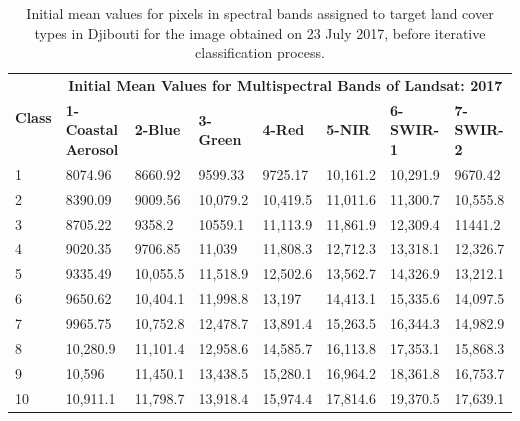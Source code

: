 \documentclass[jimaging,article,accept,pdftex,moreauthors]{Definitions/mdpi}
\begin{document}
\vspace{-6pt}
\begin{table}[H]\footnotesize
  \caption{Initial mean values for pixels in spectral bands assigned to target land cover types in Djibouti for the image obtained on 23 July 2017, before iterative classification process.}
  \centering
  \begin{tabularx}{\textwidth}{p{0.7cm}p{2.5cm}p{1.0cm}p{1.3cm}p{1.0cm}p{1.0cm}p{1.5cm}p{1.5cm}}
  \toprule
  \multirow{2}{*}{\textbf{Class}} & \multicolumn{7}{c}{\textbf{Initial Mean Values for Multispectral Bands of Landsat:  2017}} \\
     & \textbf{1-Coastal Aerosol} & \textbf{2-Blue} & \textbf{3-Green} & \textbf{4-Red} & \textbf{5-NIR} & \textbf{6-SWIR-1} & \textbf{7-SWIR-2} \\
    \midrule
    1 & 8074.96 & 8660.92 & 9599.33 & 9725.17 & 10,161.2 & 10,291.9 & 9670.42 \\
    2 & 8390.09 & 9009.56 & 10,079.2 & 10,419.5 & 11,011.6 & 11,300.7 & 10,555.8 \\
    3 & 8705.22 & 9358.2 & 10559.1 & 11,113.9 & 11,861.9 & 12,309.4 & 11441.2 \\
    4 & 9020.35 & 9706.85 & 11,039 & 11,808.3 & 12,712.3 & 13,318.1 & 12,326.7 \\
    5 & 9335.49 & 10,055.5 & 11,518.9 & 12,502.6 & 13,562.7 & 14,326.9 & 13,212.1 \\
    6 & 9650.62 & 10,404.1 & 11,998.8 & 13,197 & 14,413.1 & 15,335.6 & 14,097.5 \\
    7 & 9965.75 &10,752.8 & 12,478.7 &13,891.4 & 15,263.5 & 16,344.3 & 14,982.9 \\
    8 & 10,280.9 & 11,101.4 & 12,958.6 & 14,585.7 & 16,113.8 & 17,353.1 & 15,868.3 \\
    9 & 10,596 &11,450.1 & 13,438.5 & 15,280.1 & 16,964.2 & 18,361.8 & 16,753.7 \\
    10 & 10,911.1 & 11,798.7 & 13,918.4 & 15,974.4 & 17,814.6 & 19,370.5 & 17,639.1 \\
\bottomrule
\end{tabularx}

  \label{tabA2} 
\end{table} 
\end{document}
